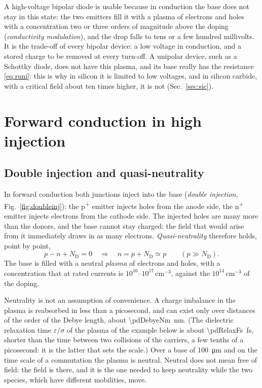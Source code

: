 \documentclass[10pt,a4paper]{scrartcl}
\newcommand{\ND}{N_\mathrm{D}}
\newcommand{\Pp}{p\textsuperscript{+}}
\newcommand{\Np}{n\textsuperscript{+}}
\newcommand{\cmc}{\si{\centi\metre^{-3}}}
\begin{document}
A high-voltage bipolar diode is usable because in conduction the base does not stay in this state: the two emitters fill it with a plasma of electrons and holes with a concentration two or three orders of magnitude above the doping (\emph{conductivity modulation}), and the drop falls to tens or a few hundred millivolts. It is the trade-off of every bipolar device: a low voltage in conduction, and a stored charge to be removed at every turn-off. A unipolar device, such as a Schottky diode, does not have this plasma, and its base really has the resistance \eqref{eq:runi}: this is why in silicon it is limited to low voltages, and in silicon carbide, with a critical field about ten times higher, it is not (Sec.~\ref{sec:sic}).
\section{Forward conduction in high injection}
\label{sec:conduction}
\subsection{Double injection and quasi-neutrality}
\label{sec:doubleinj}
In forward conduction both junctions inject into the base (\emph{double injection}, Fig.~\ref{fig:doubleinj}): the \Pp{} emitter injects holes from the anode side, the \Np{} emitter injects electrons from the cathode side. The injected holes are many more than the donors, and the base cannot stay charged: the field that would arise from it immediately draws in as many electrons. \emph{Quasi-neutrality} therefore holds, point by point,
\begin{equation}
p - n + \ND = 0 \quad\Longrightarrow\quad n = p + \ND \simeq p \qquad (p \gg \ND) .
\label{eq:neutrality}
\end{equation}
The base is filled with a neutral \emph{plasma} of electrons and holes, with a concentration that at rated currents is $10^{16}$--$10^{17}\,\cmc$, against the $10^{14}\,\cmc$ of the doping.

Neutrality is not an assumption of convenience. A charge imbalance in the plasma is reabsorbed in less than a picosecond, and can exist only over distances of the order of the Debye length, about \SI{\pdDebyeNm}{\nano\metre}. (The dielectric relaxation time $\varepsilon/\sigma$ of the plasma of the example below is about \SI{\pdRelaxFs}{\femto\second}, shorter than the time between two collisions of the carriers, a few tenths of a picosecond: it is the latter that sets the scale.) Over a base of \SI{100}{\micro\metre} and on the time scale of a commutation the plasma is neutral. Neutral does not mean free of field: the field is there, and it is the one needed to keep neutrality while the two species, which have different mobilities, move.
\end{document}
